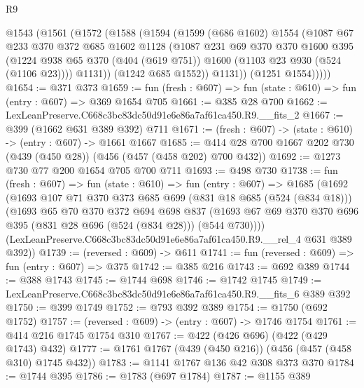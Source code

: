 \begin{lexlean}{R9}
\begin{coremodule}
      @1543
        (@1561
          (@1572
            (@1588
              (@1594
                (@1599
                  (@686 @1602)
                  @1554
                  (@1087
                    @67
                    @233
                    @370
                    @372
                    @685
                    @1602
                    @1128
                    (@1087
                      @231
                      @69
                      @370
                      @370
                      @1600
                      @395
                      (@1224
                        @938
                        @65
                        @370
                        (@404 (@619 @751))
                        @1600
                        (@1103 @23 @930 (@524 (@1106 @23))))
                      @1131))
                  (@1242 @685 @1552))
                @1131))
            (@1251 @1554)))))
@1654 := @371 @373
@1659 := fun (fresh : @607) => fun (state : @610) => fun (entry : @607) => @369 @1654 @705
@1661 := @385 @28 @700
@1662 := LexLeanPreserve.C668c3bc83dc50d91e6e86a7af61ca450.R9.__fits_2
@1667 := @399 (@1662 @631 @389 @392) @711
@1671 := (fresh : @607) -> (state : @610) -> (entry : @607) -> @1661 @1667
@1685 := @414 @28 @700 @1667 @202 @730 (@439 (@450 @28)) (@456 (@457 (@458 @202) @700 @432))
@1692 := @1273 @730 @77 @200 @1654 @705 @700 @711
@1693 := @498 @730
@1738 := fun (fresh : @607) =>
  fun (state : @610) =>
  fun (entry : @607) =>
  @1685
    (@1692
      (@1693
        @107
        @71
        @370
        @373
        @685
        @699
        (@831 @18 @685 (@524 (@834 @18)))
        (@1693
          @65
          @70
          @370
          @372
          @694
          @698
          @837
          (@1693 @67 @69 @370 @370 @696 @395 (@831 @28 @696 (@524 (@834 @28))) (@544 @730))))
      (LexLeanPreserve.C668c3bc83dc50d91e6e86a7af61ca450.R9.__rel_4 @631 @389 @392))
@1739 := (reversed : @609) -> @611
@1741 := fun (reversed : @609) => fun (entry : @607) => @375
@1742 := @385 @216
@1743 := @692 @389
@1744 := @388 @1743
@1745 := @1744 @698
@1746 := @1742 @1745
@1749 := LexLeanPreserve.C668c3bc83dc50d91e6e86a7af61ca450.R9.__fits_6 @389 @392
@1750 := @399 @1749
@1752 := @793 @392 @389
@1754 := @1750 (@692 @1752)
@1757 := (reversed : @609) -> (entry : @607) -> @1746 @1754
@1761 := @414 @216 @1745 @1754 @310
@1767 := @422 (@426 @696) (@422 (@429 @1743) @432)
@1777 := @1761 @1767 (@439 (@450 @216)) (@456 (@457 (@458 @310) @1745 @432))
@1783 := @1141 @1767 @136 @42 @308 @373 @370
@1784 := @1744 @395
@1786 := @1783 (@697 @1784)
@1787 := @1155 @389

\end{coremodule}
\end{lexlean}
